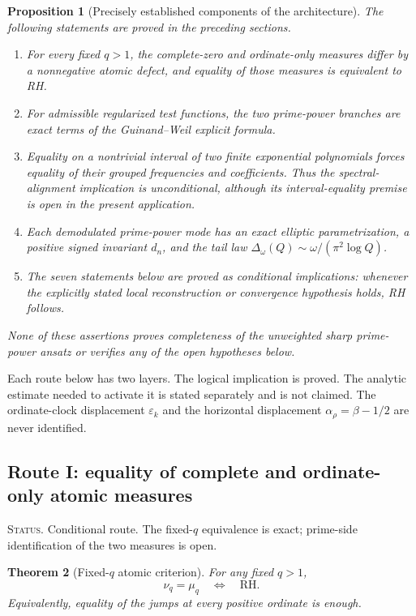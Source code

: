\documentclass[11pt]{amsart}
\numberwithin{equation}{section}
\theoremstyle{plain}
\newtheorem{theorem}{Theorem}[section]
\newtheorem{proposition}[theorem]{Proposition}
\theoremstyle{definition}
\theoremstyle{remark}
\newcommand{\RH}{\mathrm{RH}}
\newcommand{\1}{\mathbf{1}}
\newcommand{\statusnote}[1]{%
  \par\smallskip\noindent
  \begingroup\footnotesize\textsc{Status.} #1\endgroup
  \par\smallskip}
\begin{document}
\begin{proposition}[Precisely established components of the architecture]
\label{prop:established_architecture_components}
The following statements are proved in the preceding sections.
\begin{enumerate}[label=\textup{(\roman*)}]
\item For every fixed \(q>1\), the complete-zero and ordinate-only measures
differ by a nonnegative atomic defect, and equality of those measures is
equivalent to RH.
\item For admissible regularized test functions, the two prime-power branches
are exact terms of the Guinand--Weil explicit formula.
\item Equality on a nontrivial interval of two finite exponential
polynomials forces equality of their grouped frequencies and coefficients.
Thus the spectral-alignment implication is unconditional, although its
interval-equality premise is open in the present application.
\item Each demodulated prime-power mode has an exact elliptic parametrization,
a positive signed invariant \(d_n\), and the tail law
\(\Delta_\omega(Q)\sim\omega/(\pi^2\log Q)\).
\item The seven statements below are proved as conditional implications:
whenever the explicitly stated local reconstruction or convergence hypothesis
holds, RH follows.
\end{enumerate}
None of these assertions proves completeness of the unweighted sharp
prime-power ansatz or verifies any of the open hypotheses below.
\end{proposition}

Each route below has two layers.  The logical implication is proved.  The
analytic estimate needed to activate it is stated separately and is not
claimed.  The ordinate-clock displacement $\varepsilon_k$ and the horizontal
displacement $\alpha_\rho=\beta-1/2$ are never identified.

\subsection{Route I: equality of complete and ordinate-only atomic measures}
\label{subsec:route_atomic_equality}

\statusnote{Conditional route.  The fixed-$q$ equivalence is exact; prime-side identification of the two measures is open.}
\begin{theorem}[Fixed-\(q\) atomic criterion]
\label{thm:route_fixed_q_atomic}
For any fixed $q>1$,
\begin{equation}
\nu_q=\mu_q
\quad\Longleftrightarrow\quad
\RH.
\label{eq:route_fixed_q_atomic}
\end{equation}
Equivalently, equality of the jumps at every positive ordinate is enough.
\end{theorem}
\end{document}
